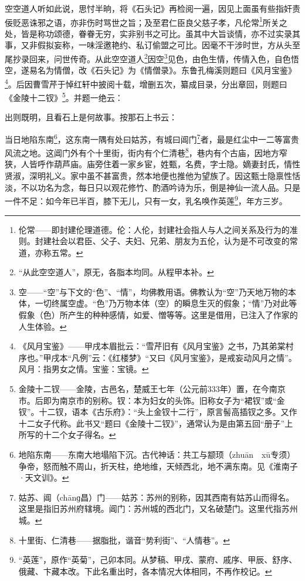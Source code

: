 \par 空空道人听如此说，思忖半晌，将《石头记》再检阅一遍，因见上面虽有些指奸责佞贬恶诛邪之语，亦非伤时骂世之旨；及至君仁臣良父慈子孝，凡伦常\footnote{伦常——即封建伦理道德。伦：人伦，封建社会指人与人之间关系及行为的准则。封建社会以君臣、父子、夫妇、兄弟、朋友为五伦，认为是不可改变的常道，亦称五常。}所关之处，皆是称功颂德，眷眷无穷，实非别书之可比。虽其中大旨谈情，亦不过实录其事，又非假拟妄称，一味淫邀艳约、私订偷盟之可比。因毫不干涉时世，方从头至尾抄录回来，问世传奇。从此空空道人\footnote{“从此空空道人”，原无，各脂本均同。从程甲本补。}因空\footnote{空——“空”与下文的“色”、“情”，均佛教用语。佛教认为“空”乃天地万物的本体，一切终属空虚。“色”乃万物本体（空）的瞬息生灭的假象；“情”乃对此等假象（色）所产生的种种感情，如爱、憎等等。这里是借用，已注入了作家的人生体验。}见色，由色生情，传情入色，自色悟空，遂易名为情僧，改《石头记》为《情僧录》。东鲁孔梅溪则题曰《风月宝鉴》\footnote{《风月宝鉴》——甲戌本眉批云：“雪芹旧有《风月宝鉴》之书，乃其弟棠村序也。”甲戌本“凡例”云：《红楼梦》“又曰《风月宝鉴》，是戒妄动风月之情”。风月：指男女之情。宝鉴：宝镜。}。后因曹雪芹于悼红轩中披阅十载，增删五次，纂成目录，分出章回，则题曰《金陵十二钗》\footnote{金陵十二钗——金陵，古邑名，楚威王七年（公元前333年）置，在今南京市。后即为南京市的别称。钗：本为妇女的头饰。旧称女子为“裙钗”或“金钗”。十二钗，语本《古乐府》：“头上金钗十二行”，原言髻高插钗之多。又作十二女子代称。此书又“题曰《金陵十二钗》”，通常认为是由第五回“册子”上所写的十二个女子得名。}。并题一绝云：
\par 出则既明，且看石上是何故事。按那石上书云：
\par 当日地陷东南\footnote{地陷东南——东南大地塌陷下沉。古代神话：共工与颛顼（zhuān　xū专须）争帝，怒而触不周山，折天柱，绝地维，天倾西北，地不满东南。见《淮南子·天文训》。}，这东南一隅有处曰姑苏，有城曰阊门\footnote{姑苏、阊（chānɡ昌）门——姑苏：苏州的别称，因其西南有姑苏山而得名。这里是指旧苏州府辖境。阊门：苏州城的西北门，又名破楚门。这里代指苏州城。}者，最是红尘中一二等富贵风流之地。这阊门外有个十里街，街内有个仁清巷\footnote{十里街、仁清巷——据脂批，谐音“势利街”、“人情巷”。}，巷内有个古庙，因地方窄狭，人皆呼作葫芦庙。庙旁住着一家乡宦，姓甄，名费，字士隐。嫡妻封氏，情性贤淑，深明礼义。家中虽不甚富贵，然本地便也推他为望族了。因这甄士隐禀性恬淡，不以功名为念，每日只以观花修竹、酌酒吟诗为乐，倒是神仙一流人品。只是一件不足：如今年已半百，膝下无儿，只有一女，乳名唤作英莲\footnote{“英莲”，原作“英菊”，己卯本同。从梦稿、甲戌、蒙府、戚序、甲辰、舒序、俄藏、卞藏本改。下此名重出时，各本情况大体相同，不再作校记。}，年方三岁。
